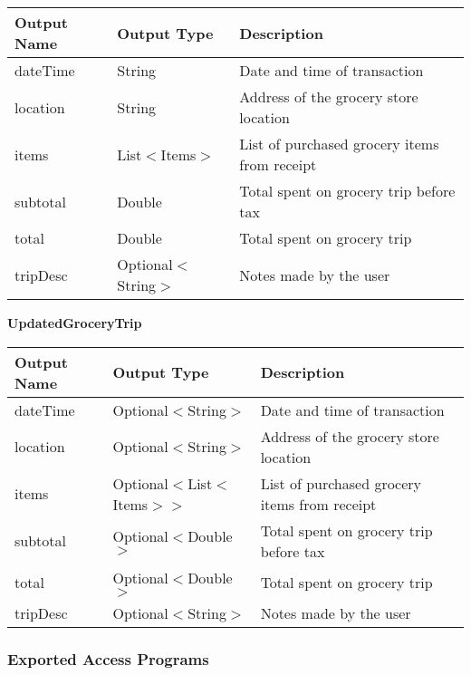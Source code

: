 \documentclass[12pt, titlepage]{article}
\begin{document}
\begin{table}[H]
  \begin{tabular}{|p{}|p{}|p{}|}
    \hline
    \textbf{Output Name} & \textbf{Output Type} & \textbf{Description} \\
    \hline
    dateTime & String & Date and time of transaction \\
    \hline
    location & String & Address of the grocery store location \\
    \hline
    items & List$<$Items$>$ & List of purchased grocery items from receipt \\
    \hline
    subtotal & Double & Total spent on grocery trip before tax \\
    \hline
    total & Double & Total spent on grocery trip \\
    \hline
    tripDesc & Optional$<$String$>$ & Notes made by the user \\
    \hline
  \end{tabular}
\end{table}

\textbf{UpdatedGroceryTrip}

\begin{table}[H]
  \begin{tabular}{|p{}|p{}|p{}|}
    \hline
    \textbf{Output Name} & \textbf{Output Type} & \textbf{Description} \\
    \hline
    dateTime & Optional$<$String$>$ & Date and time of transaction \\
    \hline
    location & Optional$<$String$>$ & Address of the grocery store location \\
    \hline
    items & Optional$<$List$<$Items$>$$>$ & List of purchased grocery items from receipt \\
    \hline
    subtotal & Optional$<$Double$>$ & Total spent on grocery trip before tax \\
    \hline
    total & Optional$<$Double$>$ & Total spent on grocery trip \\
    \hline
    tripDesc & Optional$<$String$>$ & Notes made by the user \\
    \hline
  \end{tabular}
\end{table}

\subsubsection{Exported Access Programs}
\end{document}
